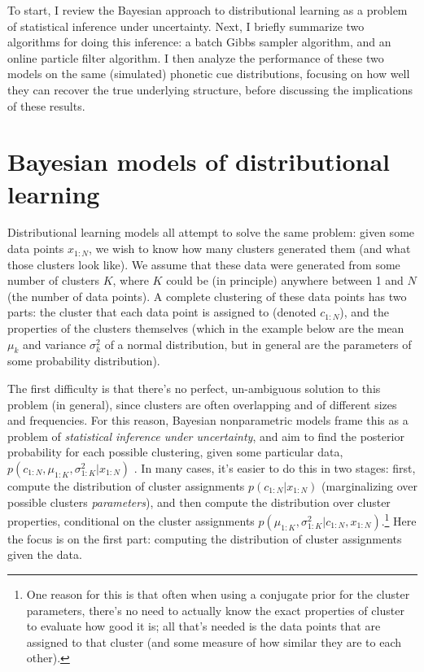 \documentclass[10pt,letterpaper]{article}
\begin{document}
To start, I review the Bayesian approach to distributional learning as a
problem of statistical inference under uncertainty. Next, I briefly
summarize two algorithms for doing this inference: a batch Gibbs sampler
algorithm, and an online particle filter algorithm. I then analyze the
performance of these two models on the same (simulated) phonetic cue
distributions, focusing on how well they can recover the true underlying
structure, before discussing the implications of these results.

\hypertarget{bayesian-models-of-distributional-learning}{%
\section{Bayesian models of distributional
learning}\label{bayesian-models-of-distributional-learning}}

Distributional learning models all attempt to solve the same problem:
given some data points \(x_{1:N}\), we wish to know how many clusters
generated them (and what those clusters look like). We assume that these
data were generated from some number of clusters \(K\), where \(K\)
could be (in principle) anywhere between 1 and \(N\) (the number of data
points). A complete clustering of these data points has two parts: the
cluster that each data point is assigned to (denoted \(c_{1:N}\)), and
the properties of the clusters themselves (which in the example below
are the mean \(\mu_k\) and variance \(\sigma^2_k\) of a normal
distribution, but in general are the parameters of some probability
distribution).

The first difficulty is that there's no perfect, un-ambiguous solution
to this problem (in general), since clusters are often overlapping and
of different sizes and frequencies. For this reason, Bayesian
nonparametric models frame this as a problem of \emph{statistical
inference under uncertainty}, and aim to find the posterior probability
for each possible clustering, given some particular data,
\(p(c_{1:N}, \mu_{1:K}, \sigma^2_{1:K} | x_{1:N})\) \autocite[see][ for
an excellent introduction]{Gershman2012}. In many cases, it's easier to
do this in two stages: first, compute the distribution of cluster
assignments \(p(c_{1:N} | x_{1:N})\) (marginalizing over possible
clusters \emph{parameters}), and then compute the distribution over
cluster properties, conditional on the cluster assignments
\(p(\mu_{1:K}, \sigma^2_{1:K} | c_{1:N}, x_{1:N})\).\footnote{One reason
  for this is that often when using a conjugate prior for the cluster
  parameters, there's no need to actually know the exact properties of
  cluster to evaluate how good it is; all that's needed is the data
  points that are assigned to that cluster (and some measure of how
  similar they are to each other).} Here the focus is on the first part:
computing the distribution of cluster assignments given the data.
\end{document}
